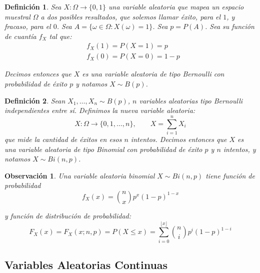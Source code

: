 \documentclass{report}
\newtheorem{dfn}{Definición}[section]
\newtheorem{obs}{Observación}[section]
\begin{document}
\begin{dfn}
    Sea $X:\Omega \rightarrow \{0,1\}$ una variable aleatoria que mapea un espacio muestral $\Omega$ a dos posibles resultados, que solemos llamar
    \emph{éxito}, para el $1$, y \emph{fracaso}, para el $0$. Sea $A=\{\omega \in\Omega: X(\omega)=1\}$. Sea $p=P(A)$. Sea su función de cuantía $f_X$ tal que:
    \begin{equation*}
        \begin{split}
            &f_X(1) = P(X=1) = p\\
            &f_X(0) = P(X=0) = 1-p
        \end{split}
    \end{equation*}
    
    Decimos entonces que $X$ es una variable aleatoria de tipo Bernoulli con probabilidad de éxito $p$ y notamos $X\sim B(p)$.
\end{dfn}

\begin{dfn}
    Sean $X_1,\ldots, X_n\sim B(p)$, $n$ variables aleatorias tipo Bernoulli independientes entre sí. Definimos la nueva variable aleatoria:
    \begin{equation*}
        X:\Omega \rightarrow \{0,1,\ldots, n\}, \qquad X=\sum_{i=1}^n X_i
    \end{equation*}
    que mide la cantidad de éxitos en esos $n$ intentos.
    Decimos entonces que $X$ es una variable aleatoria de tipo Binomial con probabilidad de éxito $p$ y $n$ intentos, y notamos $X\sim Bi(n,p)$.
\end{dfn}

\begin{obs}
    Una variable aleatoria binomial $X\sim Bi(n,p)$ tiene función de probabilidad
    \begin{equation*}
        f_X(x) = {n\choose x} p^x(1-p)^{1-x}
    \end{equation*}

    y función de distribución de probabilidad:
    \begin{equation*}
        F_X(x) = F_X(x; n,p) = P(X\leq x) = \sum_{i=0}^{\lfloor x \rfloor}  {n\choose i} p^i(1-p)^{1-i}
    \end{equation*}
\end{obs}

\subsection{Variables Aleatorias Continuas}
\end{document}

